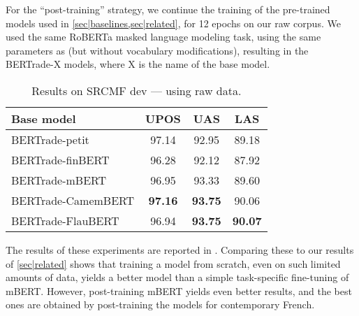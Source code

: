 For the \enquote{post-training} strategy, we continue the training of the pre-trained models used in \cref{sec|baselines,sec|related}, for \num{12} epochs on our raw corpus. We used the same RoBERTa masked language modeling task, using the same parameters as \citet{wang-etal-2020-extending} (but without vocabulary modifications), resulting in the BERTrade-X models, where X is the name of the base model.

\begin{table}[tbh]
    \centering
    \tablefontsize
    \begin{tabular}{l*{3}{S[table-format=2.2]}}
        \toprule
        {\textbf{Base model}} & {\textbf{UPOS}} & {\textbf{UAS}} & {\textbf{LAS}} \\
        \midrule
        BERTrade-petit        & 97.14           & 92.95          & 89.18          \\
        \midrule
        BERTrade-finBERT      & 96.28           & 92.12          & 87.92          \\
        BERTrade-mBERT        & 96.95           & 93.33          & 89.60          \\
        BERTrade-CamemBERT    & \textbf{97.16}  & \textbf{93.75} & 90.06          \\
        BERTrade-FlauBERT     & 96.94           & \textbf{93.75} & \textbf{90.07} \\
        \bottomrule
    \end{tabular}
    \caption{Results on SRCMF dev — using raw data.}\label{tab|post-train}
\end{table}

The results of these experiments are reported in . Comparing these to our results of \cref{sec|related} shows that training a model from scratch, even on such limited amounts of data, yields a better model than a simple task-specific fine-tuning of mBERT. However, post-training mBERT yields even better results, and the best ones are obtained by post-training the models for contemporary French.

